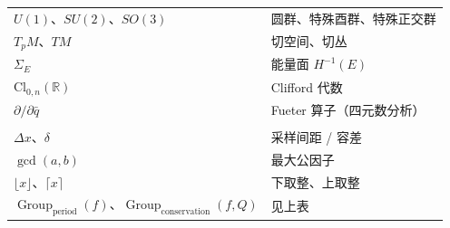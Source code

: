 \begin{longtable}{@{}>{\raggedright\arraybackslash}p{4.4cm}>{\raggedright\arraybackslash}p{9.3cm}@{}}
$U(1)$、$SU(2)$、$SO(3)$ & 圆群、特殊酉群、特殊正交群 \\
$T_pM$、$TM$ & 切空间、切丛 \\
$\Sigma_E$ & 能量面 $H^{-1}(E)$ \\
$\mathrm{Cl}_{0,n}(\mathbb{R})$ & Clifford 代数 \\
$\partial/\partial\bar q$ & Fueter 算子（四元数分析） \\
\midrule
\multicolumn{2}{@{}l}{\textit{体例记号}} \\
$\Delta x$、$\delta$ & 采样间距 / 容差 \\
$\gcd(a,b)$ & 最大公因子 \\
$\lfloor x\rfloor$、$\lceil x\rceil$ & 下取整、上取整 \\
$\operatorname{Group}_{\mathrm{period}}(f)$、$\operatorname{Group}_{\mathrm{conservation}}(f,Q)$ & 见上表 \\
\bottomrule
\end{longtable}

